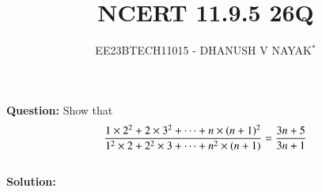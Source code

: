 \documentclass[journal,12pt,twocolumn]{IEEEtran}
\theoremstyle{remark}
\begin{document}

\vspace{3cm}

\title{NCERT 11.9.5 26Q}
\author{EE23BTECH11015 - DHANUSH V NAYAK$^{*}$%
}
\maketitle
\newpage
\bigskip

\renewcommand{\thefigure}{\theenumi}
\renewcommand{\thetable}{\theenumi}


\textbf{Question:} Show that
\begin{equation}
    \frac{1\times2^2 + 2\times3^2 + \dots + n\times(n+1)^2}{1^2\times2 + 2^2\times3 +\dots + n^2\times(n+1)}  = \frac{3n+5}{3n+1}\notag
\end{equation}\\
\textbf{Solution:}\\
\end{document}
